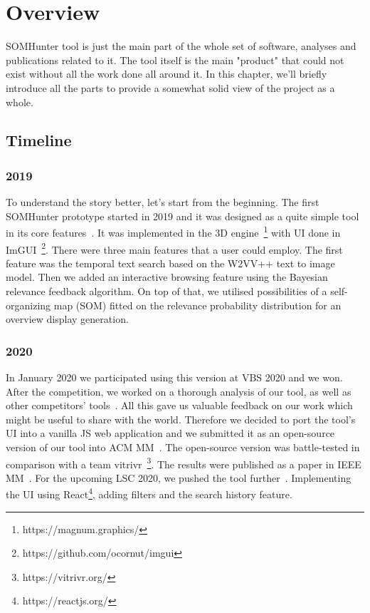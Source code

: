\chapter{Overview}
\label{overview}

SOMHunter tool is just the main part of the whole set of software, analyses and publications related to it. The tool itself is the main "product" that could not exist without all the work done all around it. In this chapter, we'll briefly introduce all the parts to provide a somewhat solid view of the project as a whole.

\section{Timeline}

\subsection{2019}
To understand the story better, let's start from the beginning. The first SOMHunter prototype started in 2019 and it was designed as a quite simple tool in its core features~\cite{kratochvil2020som}. It was implemented in the 3D engine~\footnote{https://magnum.graphics/} with UI done in ImGUI~\footnote{https://github.com/ocornut/imgui}. There were three main features that a user could employ. The first feature was the temporal text search based on the W2VV++ text to image model. Then we added an interactive browsing feature using the Bayesian relevance feedback algorithm. On top of that, we utilised possibilities of a self-organizing map (SOM) fitted on the relevance probability distribution for an overview display generation. 

\subsection{2020}
In January 2020 we participated using this version at VBS 2020 and we won. After the competition, we worked on a thorough analysis of our tool, as well as other competitors' tools~\cite{lokovc2021reign}. All this gave us valuable feedback on our work which might be useful to share with the world. Therefore we decided to port the tool's UI into a vanilla JS web application and we submitted it as an open-source version of our tool into ACM MM~\cite{kratochvil2020somhunter}. The open-source version was battle-tested in comparison with a team vitrivr~\footnote{https://vitrivr.org/}. The results were published as a paper in IEEE MM~\cite{rosetto2021}. For the upcoming LSC 2020, we pushed the tool further~\cite{mejzlik2020somhunter}. Implementing the UI using React\footnote{https://reactjs.org/}, adding filters and the search history feature.


